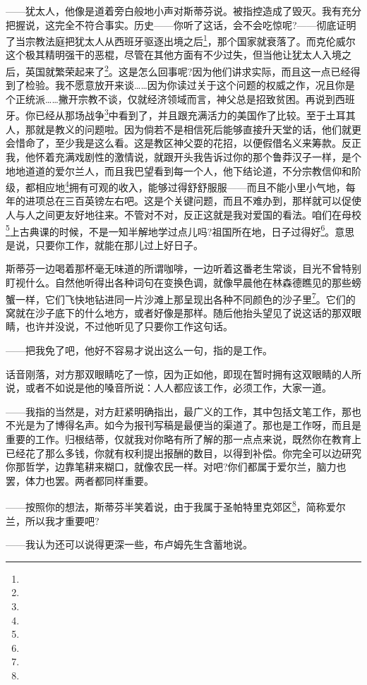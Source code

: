\par ——犹太人，他像是道着旁白般地小声对斯蒂芬说。被指控造成了毁灭。我有充分把握说，这完全不符合事实。历史——你听了这话，会不会吃惊呢?——彻底证明了当宗教法庭把犹太人从西班牙驱逐出境之后\footnote{}，那个国家就衰落了。而克伦威尔这个极其精明强干的恶棍，尽管在其他方面有不少过失，但当他让犹太人入境之后，英国就繁荣起来了\footnote{}。这是怎么回事呢?因为他们讲求实际，而且这一点已经得到了检验。我不愿意放开来谈……因为你读过关于这个问题的权威之作，况且你是个正统派……撇开宗教不谈，仅就经济领域而言，神父总是招致贫困。再说到西班牙。你已经从那场战争\footnote{}中看到了，并且跟充满活力的美国作了比较。至于土耳其人，那就是教义的问题啦。因为倘若不是相信死后能够直接升天堂的话，他们就更会惜命了，至少我是这么看。这是教区神父耍的花招，以便假借名义来筹款。反正我，他怀着充满戏剧性的激情说，就跟开头我告诉过你的那个鲁莽汉子一样，是个地地道道的爱尔兰人，而且我巴望看到每一个人，他下结论道，不分宗教信仰和阶级，都相应地\footnote{}拥有可观的收入，能够过得舒舒服服——而且不能小里小气地，每年的进项总在三百英镑左右吧。这是个关键问题，而且不难办到，那样就可以促使人与人之间更友好地往来。不管对不对，反正这就是我对爱国的看法。咱们在母校\footnote{}上古典课的时候，不是一知半解地学过点儿吗?祖国所在地，日子过得好\footnote{}。意思是说，只要你工作，就能在那儿过上好日子。
\par 斯蒂芬一边喝着那杯毫无味道的所谓咖啡，一边听着这番老生常谈，目光不曾特别盯视什么。自然他听得出各种词句在变换色调，就像早晨他在林森德瞧见的那些螃蟹一样，它们飞快地钻进同一片沙滩上那呈现出各种不同颜色的沙子里\footnote{}。它们的窝就在沙子底下的什么地方，或者好像是那样。随后他抬头望见了说这话的那双眼睛，也许并没说，不过他听见了只要你工作这句话。
\par ——把我免了吧，他好不容易才说出这么一句，指的是工作。
\par 话音刚落，对方那双眼睛吃了一惊，因为正如他，即现在暂时拥有这双眼睛的人所说，或者不如说是他的嗓音所说：人人都应该工作，必须工作，大家一道。
\par ——我指的当然是，对方赶紧明确指出，最广义的工作，其中包括文笔工作，那也不光是为了博得名声。如今为报刊写稿是最便当的渠道了。那也是工作呀，而且是重要的工作。归根结蒂，仅就我对你略有所了解的那一点点来说，既然你在教育上已经花了那么多钱，你就有权利提出报酬的数目，以得到补偿。你完全可以边研究你那哲学，边靠笔耕来糊口，就像农民一样。对吧?你们都属于爱尔兰，脑力也罢，体力也罢。两者都同样重要。
\par ——按照你的想法，斯蒂芬半笑着说，由于我属于圣帕特里克郊区\footnote{}，简称爱尔兰，所以我才重要吧?
\par ——我认为还可以说得更深一些，布卢姆先生含蓄地说。
